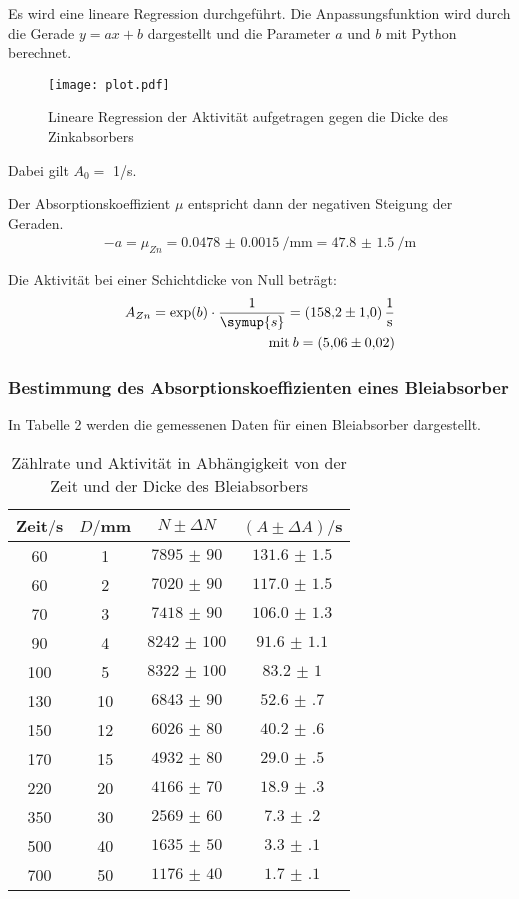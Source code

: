 Es wird eine lineare Regression durchgeführt. Die Anpassungsfunktion wird durch die Gerade $y = ax + b$  dargestellt und die Parameter $a$ und $b$
mit Python berechnet.

\begin{figure}[H]
  \centering
  \texttt{[image: plot.pdf]}
  \caption{Lineare Regression der Aktivität aufgetragen gegen die Dicke des Zinkabsorbers}
  \label{fig:plot}
\end{figure}

Dabei gilt $A_0 =$ 1/s.

Der Absorptionskoeffizient $\mu$ entspricht dann der negativen Steigung der Geraden.
\begin{align*}
  -a = \mu_{Zn} = \SI{0.0478(15)}{\per\milli\meter} = \SI{47.8(15)}{\per\meter}
\end{align*}

Die Aktivität bei einer Schichtdicke von Null beträgt:
\begin{align*}
  A_{Zn} = \exp(b) \cdot \frac{1}{\symup{s}} = \SI{158.2(10)}{\per\second} \\
  \text{mit} \: b = \SI{5.06(2)}{}
\end{align*}

\subsubsection{Bestimmung des Absorptionskoeffizienten eines Bleiabsorber}

In Tabelle 2 werden die gemessenen Daten für einen Bleiabsorber dargestellt.

\begin{table}[H]
  \centering
  \caption{Zählrate und Aktivität in Abhängigkeit von der Zeit und der Dicke des Bleiabsorbers}
  \label{tab:Rechteckspannung}
  \begin{tabular}{c c c c}
    \toprule
    Zeit$/$s & $D/$mm & $N \pm \Delta N$ & $(A \pm \Delta A)/$s\\
    \midrule
    60 & 1 & $\num{7895(90)}$  &  $\num{131.6(15)}$ \\
    60 & 2 & $\num{7020(90)}$ &   $\num{117.0(15)}$ \\
    70 & 3 & $\num{7418(90)}$ &   $\num{106.0(13)}$ \\
    90 & 4 & $\num{8242(100)}$ &  $\num{91.6(11)}$ \\
    100 & 5 & $\num{8322(100)}$ & $\num{83.2(10)}$ \\
    130 & 10 & $\num{6843(90)}$ & $\num{52.6(7)}$ \\
    150 & 12 & $\num{6026(80)}$ & $\num{40.2(6)}$ \\
    170 & 15 & $\num{4932(80)}$ & $\num{29.0(5)}$ \\
    220 & 20 & $\num{4166(70)}$ & $\num{18.9(3)}$ \\
    350 & 30 & $\num{2569(60)}$ & $\num{7.3(2)}$ \\
    500 & 40 & $\num{1635(50)}$ & $\num{3.3(1)}$ \\
    700 & 50 & $\num{1176(40)}$ & $\num{1.7(1)}$ \\
    \bottomrule
  \end{tabular}
\end{table}

